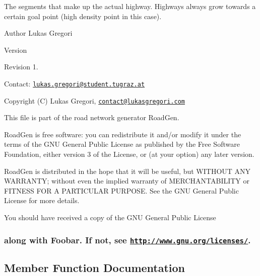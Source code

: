 The segments that make up the actual highway. Highways always grow towards a certain goal point (high density point in this case).

\begin{DoxyAuthor}{Author}
Lukas Gregori 
\end{DoxyAuthor}
\begin{DoxyVersion}{Version}

\end{DoxyVersion}
\begin{DoxyParagraph}{Revision}
1. 
\end{DoxyParagraph}


Contact\+: \href{mailto:lukas.gregori@student.tugraz.at}{\tt lukas.\+gregori@student.\+tugraz.\+at}



 Copyright (C) Lukas Gregori, \href{mailto:contact@lukasgregori.com}{\tt contact@lukasgregori.\+com}

This file is part of the road network generator Road\+Gen.

Road\+Gen is free software\+: you can redistribute it and/or modify it under the terms of the G\+NU General Public License as published by the Free Software Foundation, either version 3 of the License, or (at your option) any later version.

Road\+Gen is distributed in the hope that it will be useful, but W\+I\+T\+H\+O\+UT A\+NY W\+A\+R\+R\+A\+N\+TY; without even the implied warranty of M\+E\+R\+C\+H\+A\+N\+T\+A\+B\+I\+L\+I\+TY or F\+I\+T\+N\+E\+SS F\+OR A P\+A\+R\+T\+I\+C\+U\+L\+AR P\+U\+R\+P\+O\+SE. See the G\+NU General Public License for more details.

You should have received a copy of the G\+NU General Public License \subsubsection*{along with Foobar. If not, see \href{http://www.gnu.org/licenses/}{\tt http\+://www.\+gnu.\+org/licenses/}. }

\subsection{Member Function Documentation}
\hypertarget{class_n_t_highway_segment_adad0b1eecee26cfb43a6f53bbf560a1c}{}\label{class_n_t_highway_segment_adad0b1eecee26cfb43a6f53bbf560a1c} 
